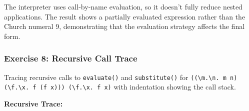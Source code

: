 \documentclass{article}
\theoremstyle{theorem}
\theoremstyle{definition}
\theoremstyle{remark}
\begin{document}
The interpreter uses call-by-name evaluation, so it doesn't fully reduce nested applications. The result shows a partially evaluated expression rather than the Church numeral 9, demonstrating that the evaluation strategy affects the final form.

\subsubsection{Exercise 8: Recursive Call Trace}

Tracing recursive calls to \texttt{evaluate()} and \texttt{substitute()} for \texttt{((\textbackslash m.\textbackslash n. m n) (\textbackslash f.\textbackslash x. f (f x))) (\textbackslash f.\textbackslash x. f x)} with indentation showing the call stack.

\textbf{Recursive Trace:}
\end{document}
